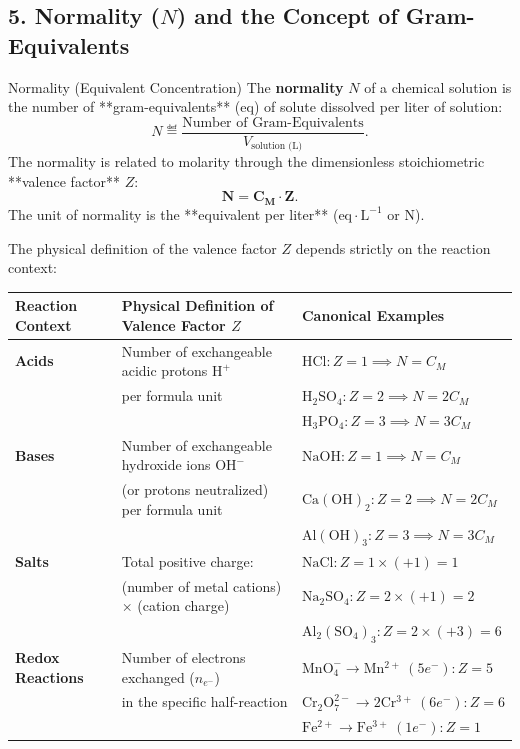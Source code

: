 \subsection{5. Normality ($N$) and the Concept of Gram-Equivalents}

\begin{definitionbox}{Normality (Equivalent Concentration)}
The \textbf{normality} $N$ of a chemical solution is the number of **gram-equivalents** ($\mathrm{eq}$) of solute dissolved per liter of solution:
\begin{equation}
N \eqdef \frac{\text{Number of Gram-Equivalents}}{V_{\text{solution (L)}}}.
\end{equation}
The normality is related to molarity through the dimensionless stoichiometric **valence factor** $Z$:
\begin{equation}
\mathbf{N = C_M \cdot Z}.
\end{equation}
The unit of normality is the **equivalent per liter** ($\mathrm{eq\cdot L^{-1}}$ or $\mathrm{N}$).
\end{definitionbox}

The physical definition of the valence factor $Z$ depends strictly on the reaction context:

\begin{center}
\renewcommand{\arraystretch}{1.35}
\begin{tabular}{@{}lll@{}}
\toprule
\textbf{Reaction Context} & \textbf{Physical Definition of Valence Factor $Z$} & \textbf{Canonical Examples} \\
\midrule
\textbf{Acids} & Number of exchangeable acidic protons $\mathrm{H}^+$ & $\mathrm{HCl}: Z = 1 \implies N = C_M$ \\
& per formula unit & $\mathrm{H_2SO_4}: Z = 2 \implies N = 2 C_M$ \\
& & $\mathrm{H_3PO_4}: Z = 3 \implies N = 3 C_M$ \\
\midrule
\textbf{Bases} & Number of exchangeable hydroxide ions $\mathrm{OH}^-$ & $\mathrm{NaOH}: Z = 1 \implies N = C_M$ \\
& (or protons neutralized) per formula unit & $\mathrm{Ca(OH)_2}: Z = 2 \implies N = 2 C_M$ \\
& & $\mathrm{Al(OH)_3}: Z = 3 \implies N = 3 C_M$ \\
\midrule
\textbf{Salts} & Total positive charge: & $\mathrm{NaCl}: Z = 1 \times (+1) = 1$ \\
& (number of metal cations) $\times$ (cation charge) & $\mathrm{Na_2SO_4}: Z = 2 \times (+1) = 2$ \\
& & $\mathrm{Al_2(SO_4)_3}: Z = 2 \times (+3) = 6$ \\
\midrule
\textbf{Redox Reactions} & Number of electrons exchanged ($n_{e^-}$) & $\mathrm{MnO_4^-} \to \mathrm{Mn^{2+}} \ (5e^-): Z = 5$ \\
& in the specific half-reaction & $\mathrm{Cr_2O_7^{2-}} \to 2\mathrm{Cr^{3+}} \ (6e^-): Z = 6$ \\
& & $\mathrm{Fe^{2+}} \to \mathrm{Fe^{3+}} \ (1e^-): Z = 1$ \\
\bottomrule
\end{tabular}
\end{center}

